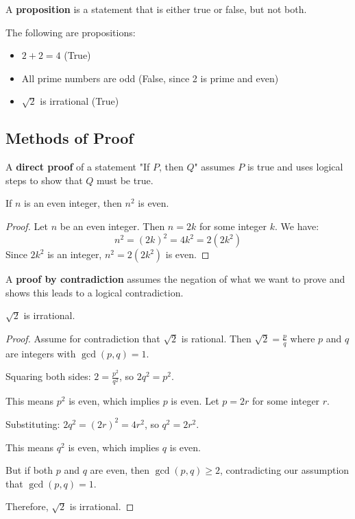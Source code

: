 \begin{definition}[Proposition]
A \textbf{proposition} is a statement that is either true or false, but not both.
\end{definition}

\begin{example}
The following are propositions:
\begin{itemize}
    \item $2 + 2 = 4$ (True)
    \item All prime numbers are odd (False, since 2 is prime and even)
    \item $\sqrt{2}$ is irrational (True)
\end{itemize}
\end{example}

\subsection{Methods of Proof}

\begin{definition}
A \textbf{direct proof} of a statement "If $P$, then $Q$" assumes $P$ is true and uses logical steps to show that $Q$ must be true.
\end{definition}

\begin{theorem}
If $n$ is an even integer, then $n^2$ is even.
\end{theorem}

\begin{proof}
Let $n$ be an even integer. Then $n = 2k$ for some integer $k$. We have:
\[n^2 = (2k)^2 = 4k^2 = 2(2k^2)\]
Since $2k^2$ is an integer, $n^2 = 2(2k^2)$ is even.
\end{proof}

\begin{definition}
A \textbf{proof by contradiction} assumes the negation of what we want to prove and shows this leads to a logical contradiction.
\end{definition}

\begin{theorem}
$\sqrt{2}$ is irrational.
\end{theorem}

\begin{proof}
Assume for contradiction that $\sqrt{2}$ is rational. Then $\sqrt{2} = \frac{p}{q}$ where $p$ and $q$ are integers with $\gcd(p,q) = 1$.

Squaring both sides: $2 = \frac{p^2}{q^2}$, so $2q^2 = p^2$.

This means $p^2$ is even, which implies $p$ is even. Let $p = 2r$ for some integer $r$.

Substituting: $2q^2 = (2r)^2 = 4r^2$, so $q^2 = 2r^2$.

This means $q^2$ is even, which implies $q$ is even.

But if both $p$ and $q$ are even, then $\gcd(p,q) \geq 2$, contradicting our assumption that $\gcd(p,q) = 1$.

Therefore, $\sqrt{2}$ is irrational.
\end{proof}

